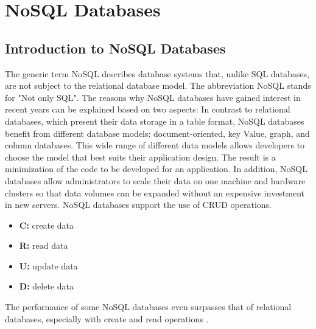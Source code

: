 \section{NoSQL Databases}

\subsection{Introduction to NoSQL Databases}
The generic term NoSQL describes database systems that, unlike SQL databases, are not subject to the relational database model. The abbreviation NoSQL stands for "Not only SQL". The reasons why NoSQL databases have gained interest in recent years can be explained based on two aspects: In contrast to relational databases, which present their data storage in a table format, NoSQL databases benefit from different database models: document-oriented, key Value, graph, and column databases. This wide range of different data models allows developers to choose the model that best suits their application design. The result is a minimization of the code to be developed for an application. In addition, NoSQL databases allow administrators to scale their data on one machine and hardware clusters so that data volumes can be expanded without an expensive investment in new servers. NoSQL databases support the use of CRUD operations.
\begin{itemize}
	\item \textbf{C:} create data
	\item \textbf{R:} read data
	\item \textbf{U:} update data
	\item \textbf{D:} delete data
\end{itemize}
The performance of some NoSQL databases even surpasses that of relational databases, especially with create and read operations \cite{.crud}.
